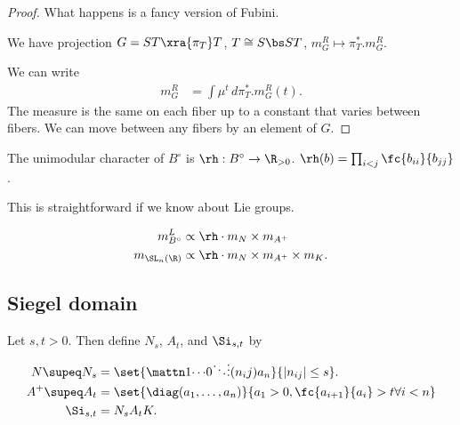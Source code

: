 \begin{proof}
What happens is a fancy version of Fubini.

We have projection $G=ST\xra{\pi_T} T$, $T\cong S\bs ST$, $m_G^R \mapsto \pi_T^*.m_G^R$. 

We can write
\begin{align}
m_G^R &=\int \mu^t\,d\pi_T^* . m_G^R(t). 
\end{align}
The measure is the same on each fiber up to a constant that varies between fibers.
We can move between any fibers by  an element of $G$. 
\end{proof}

\begin{pr}
The unimodular character of $B^\circ$ is
$\rh:B^\circ \to \R_{>0}$. $\rh(b) = \prod_{i<j} \fc{b_{ii}}{b_{jj}}$. 
\end{pr}
This is straightforward if we know about Lie groups. 
\begin{cor}
\begin{align}
m_{B^\circ}^L&\propto \rh \cdot m_N\times m_{A^+}\\
m_{\SL_n(\R)} &\propto \rh \cdot m_{N} \times m_{A^+} \times m_K.
\end{align}
\end{cor}

\subsection{Siegel domain}

\begin{df}
Let $s,t>0$. Then define $N_s$, $A_t$, and $\Si_{s,t}$ by
\begin{align}
N\supeq N_s &= \set{\mattn 1{\cdots}{0}{}{\ddots}{\vdots}{(n_ij)}{}{a_n}}{|n_{ij}|\le s}.\\
A^+ \supeq A_t 
&= \set{\diag(a_1,\ldots, a_n)}{a_1>0,\fc{a_{i+1}}{a_i} > t\forall i<n}\\
\Si_{s,t} &= N_s A_tK.
\end{align}
\end{df}

